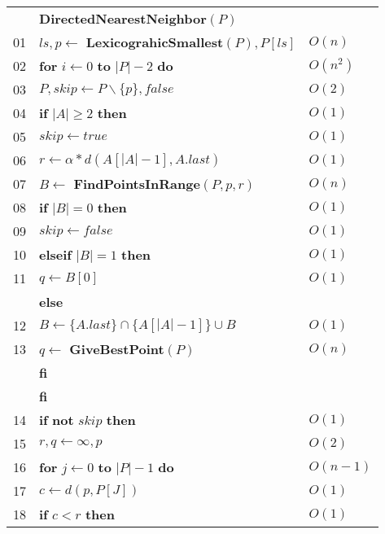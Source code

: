 \documentclass[]{article}
\begin{document}
    \begin{tabular}{lll}
      & \textbf{DirectedNearestNeighbor}$(P)$                           & \\
    01 & $ls,p \gets $ \textbf{LexicograhicSmallest}$(P),P[ls]$         & $O(n)$ \\
    02 & \textbf{for} $i \gets 0$ \textbf{to} $|P| - 2$ \textbf{do}     & $O(n^{2})$\\
    03 & \qquad $P,skip \gets P \backslash \{ p\},false$                & $O(2)$\\
    04 & \qquad \textbf{if} $|A| \geq 2$ \textbf{then}                  & $O(1)$\\
    05 & \qquad \qquad $skip \gets true$                                & $O(1)$\\
    06 & \qquad \qquad $r \gets \alpha * d(A[|A|-1],A.last) $           & $O(1)$\\
    07 & \qquad \qquad $B \gets $ \textbf{FindPointsInRange}$(P,p,r)$   & $O(n)$\\
    08 & \qquad \qquad \textbf{if} $|B| = 0$ \textbf{then}              & $O(1)$\\
    09 & \qquad \qquad \qquad $skip \gets false$                        & $O(1)$\\
    10 & \qquad \qquad \textbf{elseif} $|B| = 1$ \textbf{then}          & $O(1)$\\
    11 & \qquad \qquad \qquad $q \gets B[0]$                            & $O(1)$\\
     & \qquad \qquad \textbf{else}                                      &\\
    12 & \qquad \qquad \qquad $B \gets \{A.last\} \cap \{A[|A|-1]\} \cup B$& $O(1)$\\
    13 & \qquad \qquad \qquad $q \gets$ \textbf{GiveBestPoint}$(P)$     & $O(n)$ \\
     & \qquad \qquad \textbf{fi} & \\
     & \qquad \textbf{fi} & \\
    14 & \qquad \textbf{if} \textbf{not} $skip$ \textbf{then}           & $O(1)$\\
    15 & \qquad \qquad $r,q \gets \infty,p$                             & $O(2)$\\
    16 & \qquad \qquad \textbf{for} $j \gets 0$ \textbf{to} $|P| - 1$ \textbf{do}  & $O(n-1)$\\
    17 & \qquad \qquad \qquad $c \gets d(p,P[J])$                       & $O(1)$ \\
    18 & \qquad \qquad \qquad \textbf{if} $c < r$ \textbf{then}         & $O(1)$\\

\end{tabular}
\end{document}
